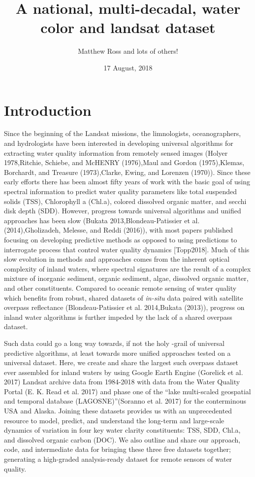 \documentclass[]{article}
\title{A national, multi-decadal, water color and landsat dataset}
\author{Matthew Ross and lots of others!}
\date{17 August, 2018}
\begin{document}
\maketitle

{
\setcounter{tocdepth}{2}
\tableofcontents
}
\section{Introduction}\label{introduction}

Since the beginning of the Landsat missions, the limnologists,
oceanographers, and hydrologists have been interested in developing
universal algorithms for extracting water quality information from
remotely sensed images (Holyer 1978,Ritchie, Schiebe, and McHENRY
(1976),Maul and Gordon (1975),Klemas, Borchardt, and Treasure
(1973),Clarke, Ewing, and Lorenzen (1970)). Since these early efforts
there has been almost fifty years of work with the basic goal of using
spectral information to predict water quality parameters like total
suspended solids (TSS), Chlorophyll a (Chl.a), colored dissolved organic
matter, and secchi disk depth (SDD). However, progress towards universal
algorithms and unified approaches has been slow (Bukata
2013,Blondeau-Patissier et al. (2014),Gholizadeh, Melesse, and Reddi
(2016)), with most papers published focusing on developing predictive
methods as opposed to using predictions to interrogate process that
control water quality dynamics {[}Topp2018{]}. Much of this slow
evolution in methods and approaches comes from the inherent optical
complexity of inland waters, where spectral signatures are the result of
a complex mixture of inorganic sediment, organic sediment, algae,
dissolved organic matter, and other constituents. Compared to oceanic
remote sensing of water quality which benefits from robust, shared
datasets of \emph{in-situ} data paired with satellite overpass
reflectance (Blondeau-Patissier et al. 2014,Bukata (2013)), progress on
inland water algorithms is further impeded by the lack of a shared
overpass dataset.

Such data could go a long way towards, if not the holy -grail of
universal predictive algorithms, at least towards more unified
approaches tested on a universal dataset. Here, we create and share the
largest such overpass dataset ever assembled for inland waters by using
Google Earth Engine (Gorelick et al. 2017) Landsat archive data from
1984-2018 with data from the Water Quality Portal (E. K. Read et al.
2017) and phase one of the ``lake multi-scaled geospatial and temporal
database (LAGOSNE)''(Soranno et al. 2017) for the conterminous USA and
Alaska. Joining these datasets provides us with an unprecedented
resource to model, predict, and understand the long-term and large-scale
dynamics of variation in four key water clarity constituents: TSS, SDD,
Chl.a, and dissolved organic carbon (DOC). We also outline and share our
approach, code, and intermediate data for bringing these three free
datasets together; generating a high-graded analysis-ready dataset for
remote sensors of water quality.
\end{document}
